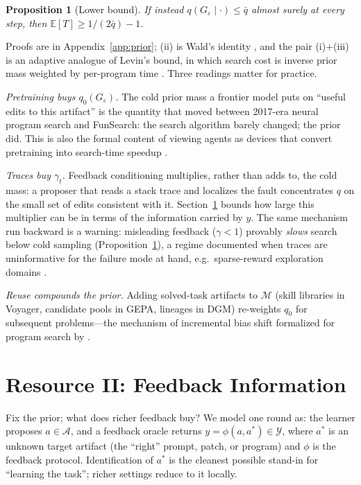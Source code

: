 \documentclass{article}
\theoremstyle{plain}
\newtheorem{proposition}[theorem]{Proposition}
\theoremstyle{definition}
\theoremstyle{remark}
\newcommand{\A}{\mathcal{A}}
\newcommand{\Y}{\mathcal{Y}}
\newcommand{\M}{\mathcal{M}}
\newcommand{\E}{\mathbb{E}}
\newcommand{\eps}{\varepsilon}
\begin{document}
\begin{proposition}[Lower bound]
\label{prop:hitlower}
If instead $q(G_\eps \mid \cdot) \le \bar{q}$ almost surely at every step, then $\E[T] \ge 1/(2\bar{q}) - 1$.
\end{proposition}

Proofs are in Appendix~\ref{app:prior}; (ii) is Wald's identity \cite{wald1944cumulative}, and the pair (i)+(iii) is an adaptive analogue of Levin's bound, in which search cost is inverse prior mass weighted by per-program time \cite{levin1973universal}. Three readings matter for practice.

\emph{Pretraining buys $q_0(G_\eps)$.} The cold prior mass a frontier model puts on ``useful edits to this artifact'' is the quantity that moved between 2017-era neural program search \cite{zoph2017nas} and FunSearch: the search algorithm barely changed; the prior did. This is also the formal content of viewing agents as devices that convert pretraining into search-time speedup \cite{achille2025universal}.

\emph{Traces buy $\gamma_t$.} Feedback conditioning multiplies, rather than adds to, the cold mass: a proposer that reads a stack trace and localizes the fault concentrates $q$ on the small set of edits consistent with it. Section~\ref{sec:feedback} bounds how large this multiplier can be in terms of the information carried by $y$. The same mechanism run backward is a warning: misleading feedback ($\gamma < 1$) provably \emph{slows} search below cold sampling (Proposition~\ref{prop:hitlower}), a regime documented when traces are uninformative for the failure mode at hand, e.g.\ sparse-reward exploration domains \cite{weng2026hl}.

\emph{Reuse compounds the prior.} Adding solved-task artifacts to $\M$ (skill libraries in Voyager, candidate pools in GEPA, lineages in DGM) re-weights $q_0$ for subsequent problems---the mechanism of incremental bias shift formalized for program search by \citet{schmidhuber1997shifting, schmidhuber2004oops}.

\section{Resource II: Feedback Information}
\label{sec:feedback}

Fix the prior; what does richer feedback buy? We model one round as: the learner proposes $a \in \A$, and a feedback oracle returns $y = \phi(a, a^*) \in \Y$, where $a^*$ is an unknown target artifact (the ``right'' prompt, patch, or program) and $\phi$ is the feedback protocol. Identification of $a^*$ is the cleanest possible stand-in for ``learning the task''; richer settings reduce to it locally.
\end{document}
